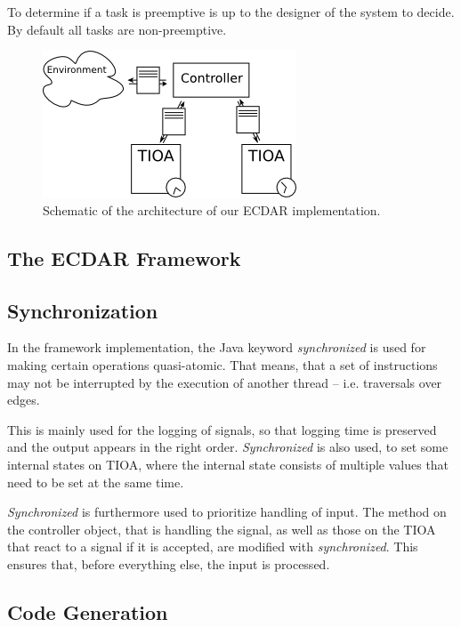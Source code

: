 To determine if a task is preemptive is up to the designer of the
system to decide. By default all tasks are non-preemptive.

\begin{figure}[t]
\begin{centering}
\includegraphics[scale=0.8]{images/ecdar_architecture_2.png}
\par\end{centering}

\caption{Schematic of the architecture of our ECDAR implementation.}
\end{figure}

\subsection{The ECDAR Framework}
\label{implementation-framework}




\subsection{Synchronization}
\label{subsec:synch}

In the framework implementation, the Java keyword \textit{synchronized} is 
used for making certain operations quasi-atomic. That means, that a set of
instructions may not be interrupted by the execution of another thread -- 
i.e. traversals over edges.

This is mainly used for the logging of signals, so that logging time
is preserved and the output appears in the right order. \textit{Synchronized}
is also used, to set some internal states on TIOA, where the internal state
consists of multiple values that need to be set at the same time.

\textit{Synchronized} is furthermore used to prioritize handling of input.  The
method on the controller object, that is handling the signal, as well as those
on the TIOA that react to a signal if it is accepted, are modified with
\textit{synchronized}. This ensures that, before everything else, the input is
processed.


\subsection{Code Generation}
\label{implementation-code-generation}


